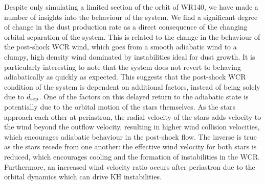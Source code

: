 Despite only simulating a limited section of the orbit of WR140, we have made a number of insights into the behaviour of the system.
We find a significant degree of change in the dust production rate as a direct consequence of the changing orbital separation of the system.
This is related to the change in the behaviour of the post-shock WCR wind, which goes from a smooth adiabatic wind to a clumpy, high density wind dominated by instabilities ideal for dust growth.
It is particularly interesting to note that the system does not revert to behaving adiabatically as quickly as expected.
This suggests that the post-shock WCR condition of the system is dependent on additional factors, instead of being solely due to $d_\text{sep}$.
One of the factors on this delayed return to the adiabatic state is potentially due to the orbital motion of the stars themselves.
As the stars approach each other at periastron, the radial velocity of the stars adds velocity to the wind beyond the outflow velocity, resulting in higher wind collision velocities, which encourages adiabatic behaviour in the post-shock flow.
The inverse is true as the stars recede from one another: the effective wind velocity for both stars is reduced, which encourages cooling and the formation of instabilities in the WCR.
Furthermore, an increased wind velocity ratio occurs after periastron due to the orbital dynamics which can drive KH instabilities.

